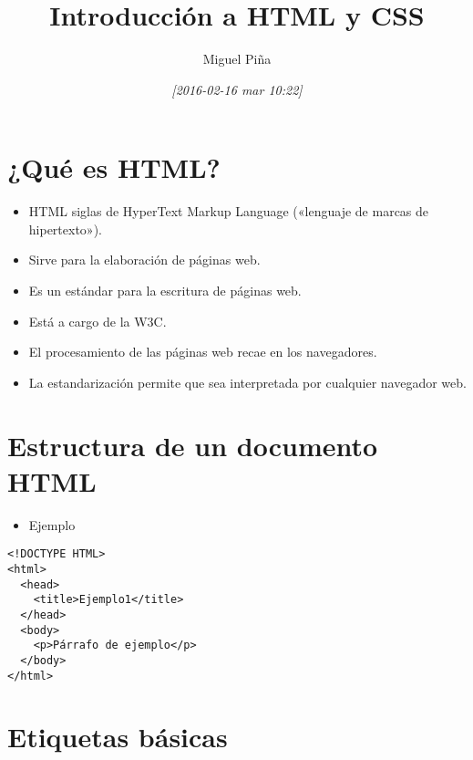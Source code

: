 \documentclass[11pt]{article}
\author{Miguel Piña}
\date{\textit{[2016-02-16 mar 10:22]}}
\title{Introducción a HTML y CSS}
\begin{document}
\maketitle
\setcounter{tocdepth}{1}
\tableofcontents





\section*{¿Qué es HTML?}
\label{sec:orgheadline1}

\begin{itemize}
\item HTML siglas de HyperText Markup Language («lenguaje de marcas de hipertexto»).
\item Sirve para la elaboración de páginas web.
\item Es un estándar para la escritura de páginas web.
\item Está a cargo de la W3C.
\item El procesamiento de las páginas web recae en los navegadores.
\item La estandarización permite que sea interpretada por cualquier navegador web.
\end{itemize}

\section*{Estructura de un documento HTML}
\label{sec:orgheadline2}

\begin{itemize}
\item Ejemplo
\end{itemize}

\begin{verbatim}
<!DOCTYPE HTML>
<html>
  <head>
    <title>Ejemplo1</title>
  </head>
  <body>
    <p>Párrafo de ejemplo</p>
  </body>
</html>
\end{verbatim}

\section*{Etiquetas básicas}
\label{sec:orgheadline3}
\end{document}
